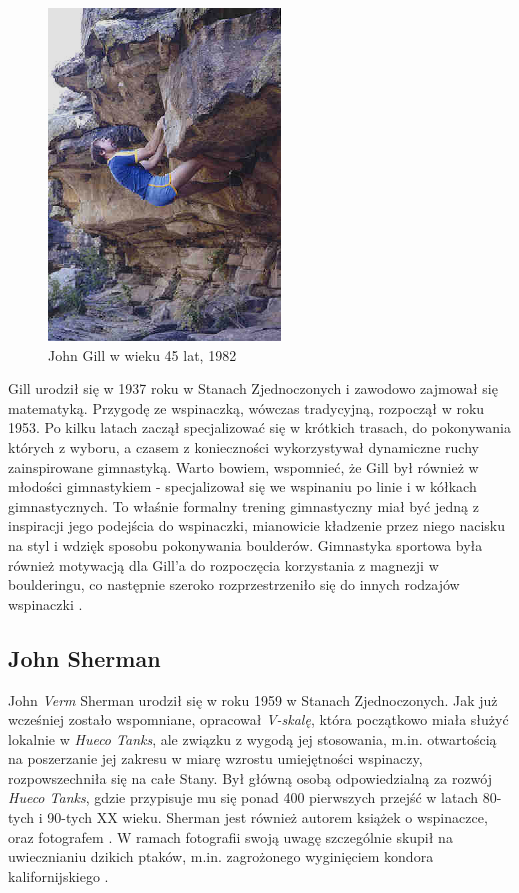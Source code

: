 \documentclass{article}
\begin{document}
\begin{figure}[!htbp]
	\begin{center}
		\includegraphics[width=0.5\linewidth]{images/gill-2.eps}
	\end{center}
	\caption{John Gill w wieku 45 lat, 1982 \cite{gill-website}}
	\label{gill-2}
\end{figure}

Gill urodził się w 1937 roku w Stanach Zjednoczonych i zawodowo zajmował się matematyką. Przygodę ze wspinaczką, wówczas tradycyjną, rozpoczął w roku 1953. Po kilku latach zaczął specjalizować się w krótkich trasach, do pokonywania których z wyboru, a czasem z konieczności wykorzystywał dynamiczne ruchy zainspirowane gimnastyką. Warto bowiem, wspomnieć, że Gill był również w młodości gimnastykiem - specjalizował się we wspinaniu po linie i w kółkach gimnastycznych. To właśnie formalny trening gimnastyczny miał być jedną z inspiracji jego podejścia do wspinaczki, mianowicie kładzenie przez niego nacisku na styl i wdzięk sposobu pokonywania boulderów. Gimnastyka sportowa była również motywacją dla Gill'a do rozpoczęcia korzystania z magnezji w boulderingu, co następnie szeroko rozprzestrzeniło się do innych rodzajów wspinaczki \cite{gill-wiki}.

\subsection{John Sherman}
\label{js}
John \textit{Verm} Sherman urodził się w roku 1959 w Stanach Zjednoczonych. Jak już wcześniej zostało wspomniane, opracował \textit{V-skalę}, która początkowo miała służyć lokalnie w \textit{Hueco Tanks}, ale związku z wygodą jej stosowania, m.in. otwartością na poszerzanie jej zakresu w miarę wzrostu umiejętności wspinaczy, rozpowszechniła się na całe Stany. Był główną osobą odpowiedzialną za rozwój \textit{Hueco Tanks}, gdzie przypisuje mu się ponad 400 pierwszych przejść w latach 80-tych i 90-tych XX wieku. Sherman jest również autorem książek o wspinaczce, oraz fotografem \cite{verm-wiki}. W ramach fotografii swoją uwagę szczególnie skupił na uwiecznianiu dzikich ptaków, m.in. zagrożonego wyginięciem kondora kalifornijskiego \cite{vimeo-verm}. 
\end{document}
